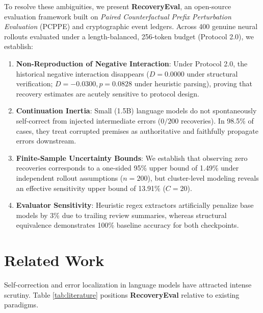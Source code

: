 \documentclass[10pt,conference]{IEEEtran}
\begin{document}
To resolve these ambiguities, we present \textbf{RecoveryEval}, an open-source evaluation framework built on \textit{Paired Counterfactual Prefix Perturbation Evaluation} (PCPPE) and cryptographic event ledgers. Across 400 genuine neural rollouts evaluated under a length-balanced, 256-token budget (Protocol 2.0), we establish:
\begin{enumerate}
    \item \textbf{Non-Reproduction of Negative Interaction}: Under Protocol 2.0, the historical negative interaction disappears ($D = 0.0000$ under structural verification; $D = -0.0300, p = 0.0828$ under heuristic parsing), proving that recovery estimates are acutely sensitive to protocol design.
    \item \textbf{Continuation Inertia}: Small (1.5B) language models do not spontaneously self-correct from injected intermediate errors ($0/200$ recoveries). In 98.5\% of cases, they treat corrupted premises as authoritative and faithfully propagate errors downstream.
    \item \textbf{Finite-Sample Uncertainty Bounds}: We establish that observing zero recoveries corresponds to a one-sided 95\% upper bound of 1.49\% under independent rollout assumptions ($n=200$), but cluster-level modeling reveals an effective sensitivity upper bound of 13.91\% ($C=20$).
    \item \textbf{Evaluator Sensitivity}: Heuristic regex extractors artificially penalize base models by 3\% due to trailing review summaries, whereas structural equivalence demonstrates 100\% baseline accuracy for both checkpoints.
\end{enumerate}

\section{Related Work}
Self-correction and error localization in language models have attracted intense scrutiny. Table \ref{tab:literature} positions \textbf{RecoveryEval} relative to existing paradigms.
\end{document}
